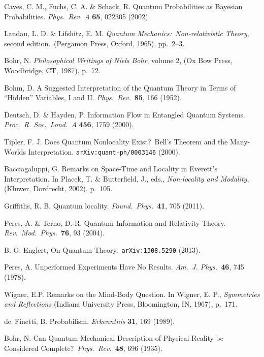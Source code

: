 \documentclass[aps,prb,superscriptaddress,12pt,tightenlines,nofootinbib]{revtex4-2}
\begin{document}
\begin{thebibliography}{99}
Caves, C. M., Fuchs, C. A. \& Schack, R. Quantum Probabilities as Bayesian Probabilities. {\sl Phys.\ Rev. A\/} {\bf 65}, 022305 (2002).

Landau, L. D. \& Lifshitz, E. M. {\sl Quantum Mechanics:\ Non-relativistic Theory}, second edition.\ (Pergamon Press, Oxford, 1965), pp.\ 2--3.

Bohr, N. {\sl Philosophical Writings of Niels Bohr}, volume 2, (Ox Bow Press, Woodbridge, CT, 1987), p.\ 72.


Bohm, D. A Suggested Interpretation of the Quantum Theory in Terms of ``Hidden'' Variables, I and II. {\sl Phys.\ Rev.}\ {\bf 85}, 166 (1952).

Deutsch, D. \& Hayden, P. Information Flow in Entangled Quantum Systems. {\sl Proc.\ R. Soc.\ Lond.\ A\/} {\bf 456}, 1759 (2000).

Tipler, F. J. Does Quantum Nonlocality Exist?\ Bell's Theorem and the Many-Worlds Interpretation. {\tt arXiv:quant-ph/0003146} (2000).

Bacciagaluppi, G. Remarks on Space-Time and Locality in Everett's Interpretation.  In Placek, T. \& Butterfield, J., eds., {\sl Non-locality and Modality}, (Kluwer, Dordrecht, 2002), p.~105.

Griffiths, R. B. Quantum locality. {\sl Found.\ Phys.}\ {\bf 41}, 705 (2011).

Peres, A. \& Terno, D. R. Quantum Information and Relativity Theory. {\sl Rev.\ Mod.\ Phys.}\ {\bf 76}, 93 (2004).

B. G. Englert, On Quantum Theory.\  {\tt arXiv:1308.5290} (2013).

Peres, A. Unperformed Experiments Have No Results. {\sl Am.\ J. Phys.}\ {\bf 46}, 745 (1978).

Wigner, E.P. Remarks on the Mind-Body Question. In Wigner, E. P.,  {\sl Symmetries and Reflections} (Indiana University Press, Bloomington, IN, 1967), p.\ 171.

de~Finetti, B. Probabilism. {\sl Erkenntnis\/} {\bf 31}, 169 (1989).

Bohr, N.  Can Quantum-Mechanical Description of Physical Reality be Considered Complete?\ {\sl Phys.\ Rev.}\ {\bf 48}, 696 (1935).



\end{thebibliography}
\end{document}
